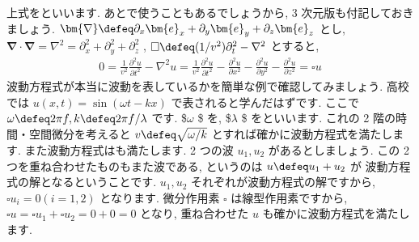 \documentclass[openany, a4paper, oneside]{jsbook}
\begin{document}
上式をといいます.
あとで使うこともあるでしょうから, 3 次元版も付記しておきましょう.
$\bm{\nabla} \defeq \partial _x \bm{e} _x + \partial _y \bm{e} _y + \partial _z \bm{e} _z$ とし,
$\bm{\nabla} \cdot \bm{\nabla} = \nabla ^2 = \partial _x ^2 + \partial _y ^2 +\partial _z ^2$ ,
$\square \defeq (1/v^2) \partial _t ^2 - \nabla ^2$
とすると,
\begin{align}
0
=
\frac{1} {v^2} \frac{\partial ^2 u} {\partial t ^2}
-\nabla ^2 u
=
\frac{1} {v^2} \frac{\partial ^2 u} {\partial t ^2}
-\frac{\partial ^2 u} {\partial  x ^2}
-\frac{\partial ^2 u} {\partial y ^2}
-\frac{\partial ^2 u} {\partial  z ^2}
=
\square u
\end{align}
波動方程式が本当に波動を表しているかを簡単な例で確認してみましょう.
高校では $u (x,t) = \sin (\omega t - k x)$ で表されると学んだはずです.
ここで $\omega \defeq 2 \pi f , k \defeq 2 \pi f/\lambda$ です.
\$$\omega$ \$ を,
\$$\lambda$ \$ をといいます.
これの 2 階の時間・空間微分を考えると $v\defeq\sqrt{\omega  /k}$ とすれば確かに波動方程式を満たします.
また波動方程式はも満たします.
2 つの波 $u_1,u_2$ があるとしましょう. この 2 つを重ね合わせたものもまた波である, というのは $u \defeq u_1 + u_2$ が
波動方程式の解となるということです.  $u_1,u_2$ それぞれが波動方程式の解ですから,
$\square u_i = 0 ( i=1,2 )$ となります.
微分作用素 $\square$ は線型作用素ですから,  $\square u = \square u_1 + \square u_2 = 0 + 0 = 0$ となり,
重ね合わせた $u$ も確かに波動方程式を満たします.
\end{document}
